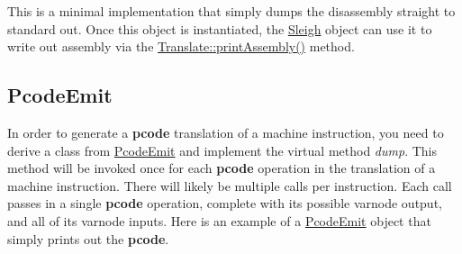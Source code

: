 This is a minimal implementation that simply dumps the disassembly straight to standard out. Once this object is instantiated, the \mbox{\hyperlink{class_sleigh}{Sleigh}} object can use it to write out assembly via the \mbox{\hyperlink{class_translate_ac97443bb89e0c6bfb68caf9f48a8c85d}{Translate\+::print\+Assembly()}} method.


\begin{DoxyCode}{0}
\DoxyCodeLine{}
\DoxyCodeLine{}
\end{DoxyCode}
\hypertarget{sleigh_a_p_ibasic_sleighpcodeemit}{}\subsection{Pcode\+Emit}\label{sleigh_a_p_ibasic_sleighpcodeemit}
In order to generate a {\bfseries{pcode}} translation of a machine instruction, you need to derive a class from \mbox{\hyperlink{class_pcode_emit}{Pcode\+Emit}} and implement the virtual method {\itshape dump}. This method will be invoked once for each {\bfseries{pcode}} operation in the translation of a machine instruction. There will likely be multiple calls per instruction. Each call passes in a single {\bfseries{pcode}} operation, complete with its possible varnode output, and all of its varnode inputs. Here is an example of a \mbox{\hyperlink{class_pcode_emit}{Pcode\+Emit}} object that simply prints out the {\bfseries{pcode}}.


